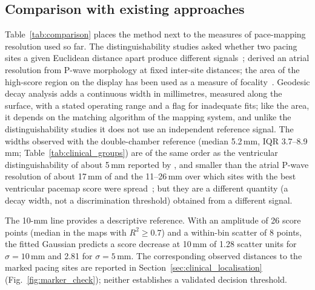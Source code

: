 \documentclass[a4paper,fleqn]{cas-dc}
\begin{document}
\subsection{Comparison with existing approaches}\label{sec:disc_comparison}
Table~\ref{tab:comparison} places the method next to the measures of
pace-mapping resolution used so far.  The distinguishability studies
asked whether two pacing sites a given Euclidean distance apart produce
different signals~\citep{kadish1991, azegami2005}; \citet{man1996}
derived an atrial resolution from P-wave morphology at fixed
inter-site distances; the area of the high-score region on the display
has been used as a measure of focality~\citep{lyan2024, willert2024}.
Geodesic decay analysis adds a continuous width in millimetres,
measured along the surface, with a stated operating range and a flag
for inadequate fits; like the area, it depends on the matching
algorithm of the mapping system, and unlike the distinguishability
studies it does not use an independent reference signal.  The widths
observed with the double-chamber reference (median 5.2\,mm, IQR
3.7--8.9\,mm; Table~\ref{tab:clinical_groups}) are of the same
order as the ventricular distinguishability of about 5\,mm reported by
\citet{kadish1991}, and smaller than the atrial P-wave resolution of
about 17\,mm of \citet{man1996} and the 11--26\,mm over which sites with
the best ventricular pacemap score were spread~\citep{azegami2005}; but
they are a different quantity (a decay width, not a discrimination
threshold) obtained from a different signal.

The 10-mm line provides a descriptive reference.  With an amplitude of
26 score points (median in the maps with $R^2 \ge 0.7$) and a within-bin
scatter of 8 points, the fitted Gaussian predicts a score decrease at
10\,mm of 1.28 scatter units for $\sigma = 10$\,mm and 2.81 for
$\sigma = 5$\,mm.  The corresponding observed distances to the marked
pacing sites are reported in Section~\ref{sec:clinical_localisation}
(Fig.~\ref{fig:marker_check}); neither establishes a validated decision
threshold.
\end{document}
